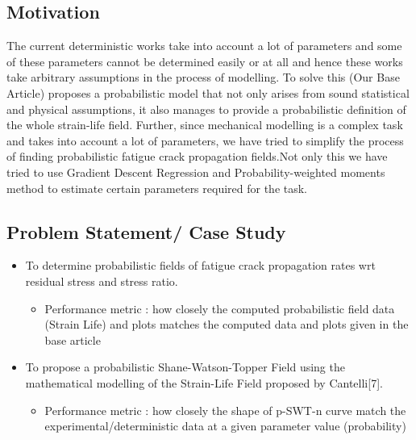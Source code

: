 \documentclass[11pt]{article}
\providecommand{\tightlist}{%
      \setlength{\itemsep}{0pt}\setlength{\parskip}{0pt}}
\begin{document}
\hypertarget{motivation}{%
\subsection{Motivation}\label{motivation}}

The current deterministic works take into account a lot of parameters
and some of these parameters cannot be determined easily or at all and
hence these works take arbitrary assumptions in the process of modelling.
To solve this (Our Base Article) proposes a probabilistic model that not
only arises from sound statistical and physical assumptions, it also
manages to provide a probabilistic definition of the whole strain-life
field. Further, since mechanical modelling is a complex task and takes
into account a lot of parameters, we have tried to simplify the process
of finding probabilistic fatigue crack propagation fields.Not only this
we have tried to use Gradient Descent Regression and
Probability-weighted moments method to estimate certain parameters
required for the task.

\hypertarget{problem-statement-case-study}{%
\subsection{Problem Statement/ Case
Study}\label{problem-statement-case-study}}

\begin{itemize}
\tightlist
\item
  To determine probabilistic fields of fatigue crack propagation rates
  wrt residual stress and stress ratio.

  \begin{itemize}
  \tightlist
  \item
    Performance metric : how closely the computed probabilistic field
    data (Strain Life) and plots matches the computed data and plots
    given in the base article
  \end{itemize}
\item
  To propose a probabilistic Shane-Watson-Topper Field using the
  mathematical modelling of the Strain-Life Field proposed by
  Cantelli{[}7{]}.

  \begin{itemize}
  \tightlist
  \item
    Performance metric : how closely the shape of p-SWT-n curve match
    the experimental/deterministic data at a given parameter value
    (probability)
  \end{itemize}
\end{itemize}
\end{document}
